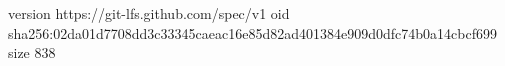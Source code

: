 version https://git-lfs.github.com/spec/v1
oid sha256:02da01d7708dd3c33345caeac16e85d82ad401384e909d0dfc74b0a14cbcf699
size 838

